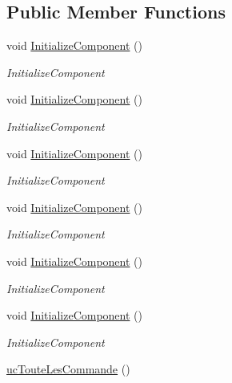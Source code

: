 \subsection*{Public Member Functions}
\begin{DoxyCompactItemize}
\item 
void \hyperlink{classnewPizza1_1_1ucTouteLesCommande_a8349ab5709ac09dd8c7e3f8d2cc0b633}{Initialize\+Component} ()
\begin{DoxyCompactList}\small\item\em Initialize\+Component \end{DoxyCompactList}\item 
void \hyperlink{classnewPizza1_1_1ucTouteLesCommande_a8349ab5709ac09dd8c7e3f8d2cc0b633}{Initialize\+Component} ()
\begin{DoxyCompactList}\small\item\em Initialize\+Component \end{DoxyCompactList}\item 
void \hyperlink{classnewPizza1_1_1ucTouteLesCommande_a8349ab5709ac09dd8c7e3f8d2cc0b633}{Initialize\+Component} ()
\begin{DoxyCompactList}\small\item\em Initialize\+Component \end{DoxyCompactList}\item 
void \hyperlink{classnewPizza1_1_1ucTouteLesCommande_a8349ab5709ac09dd8c7e3f8d2cc0b633}{Initialize\+Component} ()
\begin{DoxyCompactList}\small\item\em Initialize\+Component \end{DoxyCompactList}\item 
void \hyperlink{classnewPizza1_1_1ucTouteLesCommande_a8349ab5709ac09dd8c7e3f8d2cc0b633}{Initialize\+Component} ()
\begin{DoxyCompactList}\small\item\em Initialize\+Component \end{DoxyCompactList}\item 
void \hyperlink{classnewPizza1_1_1ucTouteLesCommande_a8349ab5709ac09dd8c7e3f8d2cc0b633}{Initialize\+Component} ()
\begin{DoxyCompactList}\small\item\em Initialize\+Component \end{DoxyCompactList}\item 
\hyperlink{classnewPizza1_1_1ucTouteLesCommande_af1ad8d344810b2a2c6d55f134ea60c1b}{uc\+Toute\+Les\+Commande} ()
\end{DoxyCompactItemize}
